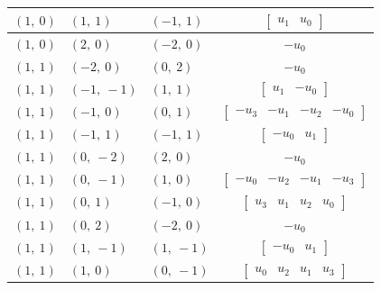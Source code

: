 \documentclass[11pt]{article}
\theoremstyle{definition}
\begin{document}
\begin{longtable}{|l|l|l|c|}
    \hline
    $\left( 1, \  0\right)$ & $\left( 1, \  1\right)$ & $\left( -1, \  1\right)$ & $\left[\begin{matrix}u_{1} & u_{0}\end{matrix}\right]$ \\
    \hline
    $\left( 1, \  0\right)$ & $\left( 2, \  0\right)$ & $\left( -2, \  0\right)$ & $- u_{0}$ \\
    \hline
    $\left( 1, \  1\right)$ & $\left( -2, \  0\right)$ & $\left( 0, \  2\right)$ & $- u_{0}$ \\
    \hline
    $\left( 1, \  1\right)$ & $\left( -1, \  -1\right)$ & $\left( 1, \  1\right)$ & $\left[\begin{matrix}u_{1} & - u_{0}\end{matrix}\right]$ \\
    \hline
    $\left( 1, \  1\right)$ & $\left( -1, \  0\right)$ & $\left( 0, \  1\right)$ & $\left[\begin{matrix}- u_{3} & - u_{1} & - u_{2} & - u_{0}\end{matrix}\right]$ \\
    \hline
    $\left( 1, \  1\right)$ & $\left( -1, \  1\right)$ & $\left( -1, \  1\right)$ & $\left[\begin{matrix}- u_{0} & u_{1}\end{matrix}\right]$ \\
    \hline
    $\left( 1, \  1\right)$ & $\left( 0, \  -2\right)$ & $\left( 2, \  0\right)$ & $- u_{0}$ \\
    \hline
    $\left( 1, \  1\right)$ & $\left( 0, \  -1\right)$ & $\left( 1, \  0\right)$ & $\left[\begin{matrix}- u_{0} & - u_{2} & - u_{1} & - u_{3}\end{matrix}\right]$ \\
    \hline
    $\left( 1, \  1\right)$ & $\left( 0, \  1\right)$ & $\left( -1, \  0\right)$ & $\left[\begin{matrix}u_{3} & u_{1} & u_{2} & u_{0}\end{matrix}\right]$ \\
    \hline
    $\left( 1, \  1\right)$ & $\left( 0, \  2\right)$ & $\left( -2, \  0\right)$ & $- u_{0}$ \\
    \hline
    $\left( 1, \  1\right)$ & $\left( 1, \  -1\right)$ & $\left( 1, \  -1\right)$ & $\left[\begin{matrix}- u_{0} & u_{1}\end{matrix}\right]$ \\
    \hline
    $\left( 1, \  1\right)$ & $\left( 1, \  0\right)$ & $\left( 0, \  -1\right)$ & $\left[\begin{matrix}u_{0} & u_{2} & u_{1} & u_{3}\end{matrix}\right]$ \\

\end{longtable}
\end{document}
